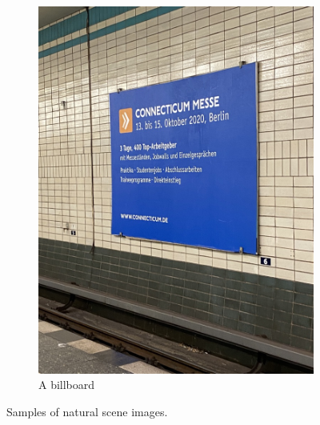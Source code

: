 \documentclass[10pt, a4paper]{article}
\begin{document}
\begin{figure}[h!]
\begin{subfigure}[b]{0.4\linewidth}
		\includegraphics[width=\linewidth]{img/sample3.jpeg}
		\caption{A billboard}
	  \end{subfigure}
	\caption{Samples of natural scene images.}
	\label{fig:samples}
  \end{figure}
\end{document}
